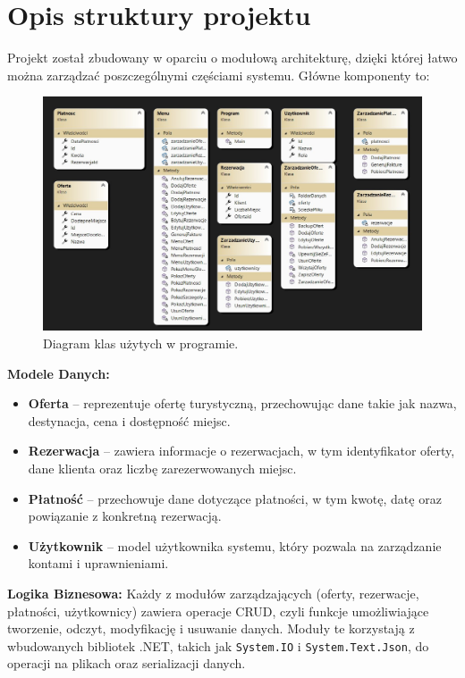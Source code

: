 ﻿%
\chapter{Opis struktury projektu}
Projekt został zbudowany w oparciu o modułową architekturę, dzięki której łatwo można zarządzać poszczególnymi częściami systemu. Główne komponenty to:
\begin{figure}[htbp]
  \centering
  \includegraphics[width=1\textwidth]{figures/diagram_klas.jpg} 
  \caption{Diagram klas użytych w programie.}
  \label{fig:obrazek}
\end{figure}

\noindent \textbf{Modele Danych:}
\begin{itemize}
    \item \textbf{Oferta} – reprezentuje ofertę turystyczną, przechowując dane takie jak nazwa, destynacja, cena i dostępność miejsc.
    \item \textbf{Rezerwacja} – zawiera informacje o rezerwacjach, w tym identyfikator oferty, dane klienta oraz liczbę zarezerwowanych miejsc.
    \item \textbf{Płatność} – przechowuje dane dotyczące płatności, w tym kwotę, datę oraz powiązanie z konkretną rezerwacją.
    \item \textbf{Użytkownik} – model użytkownika systemu, który pozwala na zarządzanie kontami i uprawnieniami.
\end{itemize}
\noindent \textbf{Logika Biznesowa:}
Każdy z modułów zarządzających (oferty, rezerwacje, płatności, użytkownicy) zawiera operacje CRUD, czyli funkcje umożliwiające tworzenie, odczyt, modyfikację i usuwanie danych. Moduły te korzystają z wbudowanych bibliotek .NET, takich jak \texttt{System.IO} i \texttt{System.Text.Json}, do operacji na plikach oraz serializacji danych.

